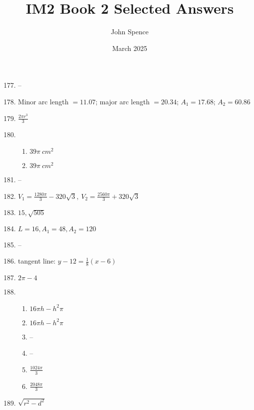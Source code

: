 \documentclass{article}
\title{IM2 Book 2 Selected Answers}
\author{John Spence}
\date{March 2025}
\begin{document}
\maketitle

\begin{enumerate}

\setcounter{enumi}{176}

\item --

\item Minor arc length $= 11.07$; major arc length $= 20.34$; $A_1 = 17.68$; $A_2 = 60.86$

\item $\frac{2 \pi r^3}{3}$

\item

	\begin{enumerate}
	
	\item $39 \pi \ cm^2$
	
	\item $39 \pi \ cm^2$
	
	\end{enumerate}
	
\item --

\item $V_1 = \frac{1280\pi}{3} - 320\sqrt{3}, \ V_2 = \frac{2560\pi}{3} + 320\sqrt{3}$

\item $15, \sqrt{505}$

\item $ L = 16, A_1 = 48, A_2 = 120$

\item --

\item tangent line: $y - 12 = \frac{1}{8}(x-6)$

\item $2\pi - 4$

\item

	\begin{enumerate}
	
	\item $16 \pi h - h^2 \pi$
	
	\item $ 16 \pi h - h^2 \pi$
	
	\item --
	
	\item --
	
	\item $\frac{1024\pi}{3}$
	
	\item $\frac{2048\pi}{3}$
	
	\end{enumerate}
	
\item $\sqrt{r^2 - d^2}$

\end{enumerate}
\end{document}
